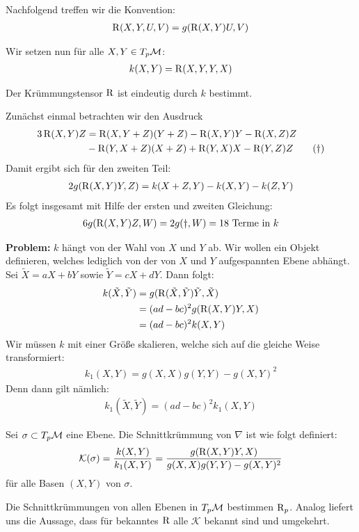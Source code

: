 \begin{defs}
Nachfolgend treffen wir die Konvention:
	\begin{align}
	\operatorname{R}(X,Y,U,V) = g(\operatorname{R}(X,Y)U,V)	
	\end{align}
\end{defs}
Wir setzen nun für alle $X,Y \in T_p\mathcal{M}$:
\begin{align}
	k(X,Y) =\operatorname{R}(X,Y,Y,X)
\end{align} 
\begin{satz}
	Der Krümmungstensor $\operatorname{R}$ ist eindeutig durch $k$ bestimmt.
\end{satz}
\begin{bew}
Zunächst einmal betrachten wir den Ausdruck
\begin{align}
3\operatorname{R}(X,Y)Z &= \operatorname{R}(X,Y+Z)(Y+Z) - \operatorname{R}(X,Y)Y -\operatorname{R}(X,Z)Z \nonumber \\ 
&-\operatorname{R}(Y,X+Z)(X+Z) + \operatorname{R}(Y,X)X-\operatorname{R}(Y,Z)Z \tag{$\dagger$}
\end{align}
Damit ergibt sich für den zweiten Teil:
\begin{align}
	2g(\operatorname{R}(X,Y)Y,Z) = k(X+Z,Y) - k(X,Y) - k(Z,Y)
\end{align}
Es folgt insgesamt mit Hilfe der ersten und zweiten Gleichung:
\begin{align}
	6g(\operatorname{R}(X,Y)Z,W) = 2g(\dagger,W) = \text{18 Terme in }k
\end{align}
\end{bew}
\textbf{Problem:} $k$ hängt von der Wahl von $X$ und $Y$ ab. Wir wollen ein Objekt definieren, welches lediglich von der von $X$ und $Y$ aufgespannten Ebene abhängt. \\
Sei $\tilde{X} = aX +bY$ sowie $\tilde{Y} = cX +dY$. Dann folgt:
\begin{align}
	k(\tilde{X},\tilde{Y}) &= g(\operatorname{R}(\tilde{X},\tilde{Y})\tilde{Y},\tilde{X}) \nonumber \\
	&= (ad-bc)^2 g(\operatorname{R}(X,Y)Y,X) \nonumber\\
	&= (ad-bc)^2 k(X,Y)
\end{align}
Wir müssen $k$ mit einer Größe skalieren, welche sich auf die gleiche Weise transformiert:
\begin{align}
	k_1(X,Y) = g(X,X)g(Y,Y) - g(X,Y)^2
\end{align}
Denn dann gilt nämlich:
\begin{align}
	k_1(\tilde{X},\tilde{Y}) = (ad-bc)^2 k_1(X,Y)
\end{align}
\begin{defs}[Schnittkrümmung]
Sei $\sigma \subset T_p\mathcal{M}$ eine Ebene. Die Schnittkrümmung von $\nabla$ ist wie folgt definiert:
\begin{align}
	\mathcal{K}(\sigma) = \frac{k(X,Y)}{k_1(X,Y)} = \frac{g(\operatorname{R}(X,Y)Y,X)}{g(X,X)g(Y,Y)-g(X,Y)^2} 
\end{align}	
für alle Basen $(X,Y)$ von $\sigma$.
\end{defs}
\begin{satz}
Die Schnittkrümmungen von allen Ebenen in $T_p\mathcal{M}$ bestimmen $\operatorname{R}_p$. Analog liefert uns die Aussage, dass für bekanntes $\operatorname{R}$	alle $\mathcal{K}$ bekannt sind und umgekehrt.
\end{satz}
	
